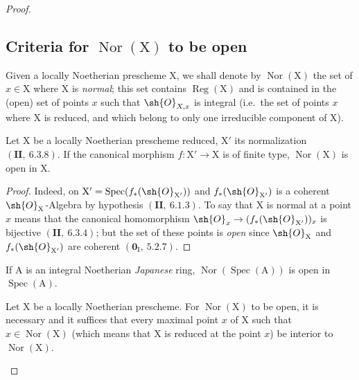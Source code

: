 \begin{proof}
\subsection{Criteria for \texorpdfstring{$\operatorname{Nor}(\mathrm{X})$}{Nor(X)} to be open}
\label{subsection:IV.6.13}
\label{IV.6.13}

\begin{env}[6.13.1]
\label{IV.6.13.1}
Given a locally Noetherian prescheme $\mathrm{X}$, we shall denote by
$\operatorname{Nor}(\mathrm{X})$ the set of $x\in\mathrm{X}$ where $\mathrm{X}$ is \emph{normal}; this set contains $\operatorname{Reg}(\mathrm{X})$ and is
contained in the (open) set of points $x$ such that $\sh{O}_{X,x}$ is integral (i.e.\ the set
of points $x$ where $\mathrm{X}$ is reduced, and which belong to only one irreducible component
of $\mathrm{X}$).
\end{env}

\begin{proposition}[6.13.2]
\label{IV.6.13.2}
Let $\mathrm{X}$ be a locally Noetherian prescheme reduced, $\mathrm{X}'$ its
normalization $(\mathbf{II},~6.3.8)$. If the canonical morphism $f:\mathrm{X}'\to\mathrm{X}$ is of finite type, $\operatorname{Nor}(\mathrm{X})$ is open in $\mathrm{X}$.
\end{proposition}

\begin{proof}
Indeed, on $\mathrm{X}'=\operatorname{Spec}(f_*(\sh{O}_{\mathrm{X}'}))$ and $f_*(\sh{O}_{\mathrm{X}'})$ is a coherent $\sh{O}_\mathrm{X}$-Algebra by
hypothesis $(\mathbf{II},~6.1.3)$. To say that $\mathrm{X}$ is normal at a point $x$ means that the canonical
homomorphism $\sh{O}_x\to(f_*(\sh{O}_{\mathrm{X}'}))_x$ is bijective $(\mathbf{II},~6.3.4)$; but the set of these points is \emph{open}
since $\sh{O}_\mathrm{X}$ and $f_*(\sh{O}_{\mathrm{X}'})$ are coherent $(\mathbf{0}_\mathrm{I},~5.2.7)$.
\end{proof}

\begin{corollary}[6.13.3]
\label{IV.6.13.3}
If $\mathrm{A}$ is an integral Noetherian \emph{Japanese} ring, $\operatorname{Nor}(\operatorname{Spec}(\mathrm{A}))$
is open in $\operatorname{Spec}(\mathrm{A})$.
\end{corollary}

\begin{proposition}[6.13.4]
\label{IV.6.13.4}
Let $\mathrm{X}$ be a locally Noetherian prescheme. For $\operatorname{Nor}(\mathrm{X})$
to be open, it is necessary and it suffices that every maximal point $x$ of $\mathrm{X}$ such that $x\in\operatorname{Nor}(\mathrm{X})$ (which means
that $\mathrm{X}$ is reduced at the point $x$) be interior to $\operatorname{Nor}(\mathrm{X})$.
\end{proposition}


\end{proof}
